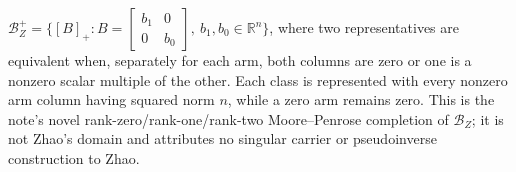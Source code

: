 \(\mathcal B_Z^+=\{[B]_+:B=\begin{bmatrix}b_1&0\\0&b_0\end{bmatrix},\ b_1,b_0\in\mathbb R^n\}\), where two representatives are equivalent when, separately for each arm, both columns are zero or one is a nonzero scalar multiple of the other.  Each class is represented with every nonzero arm column having squared norm \(n\), while a zero arm remains zero.  This is the note's novel rank-zero/rank-one/rank-two Moore--Penrose completion of \(\mathcal B_Z\); it is not Zhao's domain and attributes no singular carrier or pseudoinverse construction to Zhao.